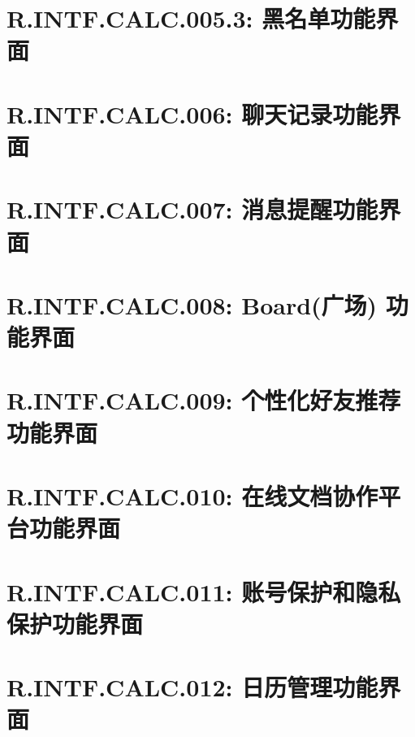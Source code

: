     \section{R.INTF.CALC.005.3: 黑名单功能界面}
    
    \section{R.INTF.CALC.006: 聊天记录功能界面}
    
    \section{R.INTF.CALC.007: 消息提醒功能界面}
    
    \section{R.INTF.CALC.008: Board(广场) 功能界面}
    
    \section{R.INTF.CALC.009: 个性化好友推荐功能界面}
    
    \section{R.INTF.CALC.010: 在线文档协作平台功能界面}
    
    \section{R.INTF.CALC.011: 账号保护和隐私保护功能界面}
    
    \section{R.INTF.CALC.012: 日历管理功能界面}
    
